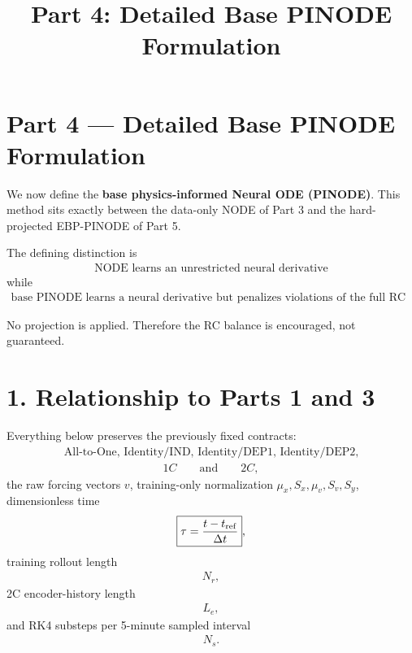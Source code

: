 \documentclass[11pt]{article}
\title{Part 4: Detailed Base PINODE Formulation}
\author{}
\date{}
\begin{document}
\maketitle

\section*{Part 4 --- Detailed Base PINODE Formulation}

We now define the \textbf{base physics-informed Neural ODE (PINODE)}. This method sits exactly between the data-only NODE of Part 3 and the hard-projected EBP-PINODE of Part 5.

The defining distinction is
\begin{align}
\boxed{\text{NODE learns an unrestricted neural derivative}}
\end{align}
while
\begin{align}
\boxed{\text{base PINODE learns a neural derivative but penalizes violations of the full RC equations softly.}}
\end{align}

No projection is applied. Therefore the RC balance is encouraged, not guaranteed.

\section*{1. Relationship to Parts 1 and 3}

Everything below preserves the previously fixed contracts:
\begin{align}
\boxed{\text{All-to-One,\ Identity/IND,\ Identity/DEP1,\ Identity/DEP2}},
\end{align}
\begin{align}
\boxed{1C\qquad\text{and}\qquad 2C},
\end{align}
the raw forcing vectors \(v\), training-only normalization \(\mu_x,S_x,\mu_v,S_v,S_y\), dimensionless time
\begin{align}
\boxed{\tau=\frac{t-t_{\rm ref}}{\Delta t}},
\end{align}
training rollout length
\begin{align}
\boxed{N_r},
\end{align}
2C encoder-history length
\begin{align}
\boxed{L_e},
\end{align}
and RK4 substeps per 5-minute sampled interval
\begin{align}
\boxed{N_s}.
\end{align}
\end{document}
